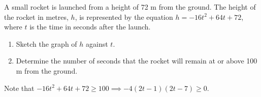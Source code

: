 \begin{problem}
    A small rocket is launched from a height of 72 m from the ground. The height of the rocket in metres, $h$, is represented by the equation $h = -16t^2 + 64t+72$, where $t$ is the time in seconds after the launch.

    \begin{enumerate}
        \item Sketch the graph of $h$ against $t$.
        \item Determine the number of seconds that the rocket will remain at or above 100 m from the ground.
    \end{enumerate}
\end{problem}
\begin{solution}
    \begin{ppart}
        \begin{center}
        \end{center}
    \end{ppart}
    \begin{ppart}
        Note that $-16t^2 + 64t+72 \geq 100 \implies -4(2t-1)(2t-7) \geq 0$.


\end{ppart}
\end{solution}
